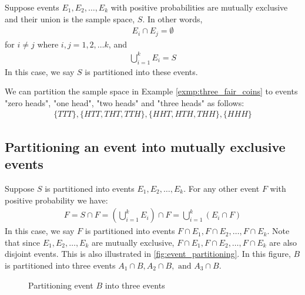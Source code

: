 Suppose events \( E_1, E_2, \ldots, E_k \) with positive probabilities are mutually exclusive and their union is the sample space, \( S \).
In other words,
\begin{gather*}
	E_i \cap E_j = \emptyset
\end{gather*}
for \( i \neq j \) where \( i, j = 1, 2, \ldots k \), and
\begin{gather*}
	\bigcup_{i = 1}^{k} E_i = S
\end{gather*}
In this case, we say \( S \) is partitioned into these events.

\begin{exmp}
	We can partition the sample space in Example \autoref{exmp:three_fair_coins} to events "zero heads", "one head", "two heads" and "three heads" as follows:
	\begin{gather*}
		\{ TTT \}, \{ HTT, THT, TTH \}, \{ HHT, HTH, THH \}, \{ HHH \}
	\end{gather*}
\end{exmp}

\subsection{Partitioning an event into mutually exclusive events}

Suppose \( S \) is partitioned into events \( E_1, E_2, \ldots, E_k \).
For any other event \( F \) with positive probability we have:
\begin{gather*}
	F = S \cap F = (\bigcup_{i = 1}^{k} E_i) \cap F = \bigcup_{i = 1}^{k} (E_i \cap F)
\end{gather*}
In this case, we say \( F \) is partitioned into events \( F \cap E_1, F \cap E_2, \ldots, F \cap E_k \).
Note that since \( E_1, E_2, \ldots, E_k \) are mutually exclusive, \( F \cap E_1, F \cap E_2, \ldots, F \cap E_k \) are also disjoint events.
This is also illustrated in \autoref{fig:event_partitioning}.
In this figure, \( B \) is partitioned into three events \( A_1 \cap B, A_2 \cap B, \text{ and } A_3 \cap B \).
\begin{figure}[t]
\begin{center}
\end{center}
\caption{Partitioning event \( B \) into three events}
\label{fig:event_partitioning}
\end{figure}

